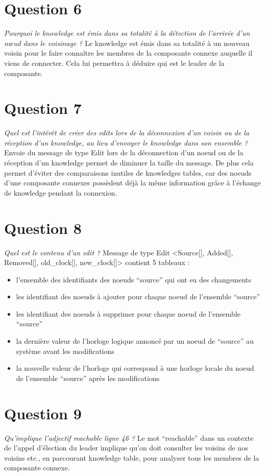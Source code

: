 \documentclass[11pt,a4paper,sans]{report}
\begin{document}
	\section{Question 6}
	\textit{Pourquoi le knowledge est émis dans sa totalité à la détection de l’arrivée d’un nœud dans le voisinage ?}
	Le knowledge est émis dans sa totalité à un nouveau voisin pour le faire connaître les membres de la composante connexe auquelle il viens de connecter. Cela lui permettra à déduire qui est le leader de la composante.


	\section{Question 7}
	\textit{Quel est l’intérêt de créer des edits lors de la déconnexion d’un voisin ou de la réception d’un knowledge, au lieu d’envoyer le knowledge dans son ensemble ?}
	Envoie du message de type Edit lors de la déconnection d’un noeud ou de la réception d’un knowledge permet de diminuer la taille du message. De plus cela permet d’éviter des comparaisons inutiles de knowledges tables, car des noeuds d’une composante connexes possèdent déjà la même information grâce à l'échange de knowledge pendant la connexion.



	\section{Question 8}
	\textit{Quel est le contenu d’un edit ?}
	Message de type Edit <Source[], Added[], Removed[], old_clock[], new_clock[]> contient 5 tableaux : 
	\begin{itemize}
		\item l’ensemble des identifiants des noeuds “source” qui ont eu des changements
		\item les identifiant des noeuds à ajouter pour chaque noeud de l’ensemble  “source”
		\item les identifiant des noeuds à supprimer pour chaque noeud de l’ensemble  “source”
		\item la dernière valeur de l’horloge logique annoncé par un noeud de “source” au système avant les modifications
		\item la nouvelle valeur de l’horloge qui correspond à une horloge locale du noeud de l’ensemble  “source” après les modifications
	\end{itemize}

	\section{Question 9}
	\textit{Qu’implique l’adjectif reachable ligne 46 ?}
	Le mot “reachable” dans un contexte de l’appel d'élection du leader implique qu’on doit consulter les voisins de nos voisins etc., en parcourant knowledge table, pour analyser tous les membres de la composante connexe.
\end{document}
